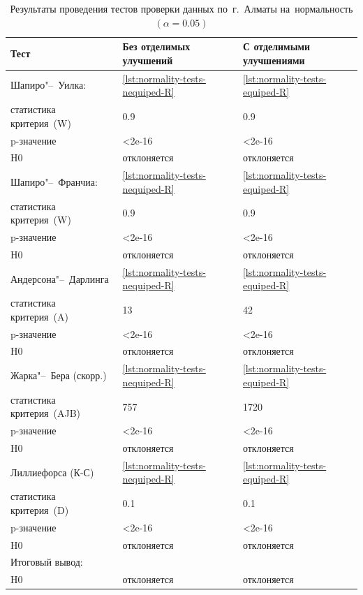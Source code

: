 \documentclass[]{scrreprt}
\begin{document}
\begin{table}[ht]
	\caption{Результаты проведения тестов проверки данных по~г.~Алматы на~нормальность $({\textstyle \alpha=0.05})$}\label{tab:normality-tests-values-R}
	\centering
	\begin{tabular}{lll}
		\hline
		Тест&Без отделимых улучшений&С отделимыми улучшениями\\
		\hline
		Шапиро"--~Уилка:&\ref{lst:normality-tests-nequiped-R}&\ref{lst:normality-tests-equiped-R}\\
		статистика критерия~(W)&0.9&0.9\\
		p-значение&<2e-16&<2e-16\\
		H0&отклоняется&отклоняется\\
		\hline
		Шапиро"--~Франчиа:&\ref{lst:normality-tests-nequiped-R}&\ref{lst:normality-tests-equiped-R}\\
		статистика критерия~(W)&0.9&0.9\\
		p-значение&<2e-16&<2e-16\\
		H0&отклоняется&отклоняется\\
		\hline
		Андерсона"--~Дарлинга&\ref{lst:normality-tests-nequiped-R}&\ref{lst:normality-tests-equiped-R}\\
		статистика критерия~(A)&13&42\\
		p-значение&<2e-16&<2e-16\\
		H0&отклоняется&отклоняется\\
		\hline
		Жарка"--~Бера (скорр.)&\ref{lst:normality-tests-nequiped-R}&\ref{lst:normality-tests-equiped-R}\\
		статистика критерия~(AJB)&757&1720\\
		p-значение&<2e-16&<2e-16\\
		H0&отклоняется&отклоняется\\
		\hline
		Лиллиефорса (К-С)&\ref{lst:normality-tests-nequiped-R}&\ref{lst:normality-tests-equiped-R}\\
		статистика критерия~(D)&0.1&0.1\\
		p-значение&<2e-16&<2e-16\\
		H0&отклоняется&отклоняется\\
		\hline
		Итоговый вывод:&&\\
		H0&отклоняется&отклоняется\\
		\hline
	\end{tabular}
\end{table}
\end{document}
